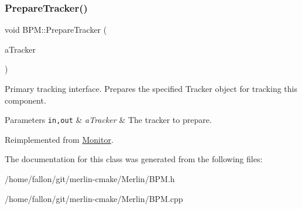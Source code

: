 \subsubsection{\texorpdfstring{Prepare\+Tracker()}{PrepareTracker()}}
{\footnotesize\ttfamily void B\+P\+M\+::\+Prepare\+Tracker (\begin{DoxyParamCaption}\item[{\hyperlink{classComponentTracker}{Component\+Tracker} \&}]{a\+Tracker }\end{DoxyParamCaption})\hspace{0.3cm}{\ttfamily [virtual]}}

Primary tracking interface. Prepares the specified Tracker object for tracking this component. 
\begin{DoxyParams}[1]{Parameters}
\mbox{\tt in,out}  & {\em a\+Tracker} & The tracker to prepare. \\
\hline
\end{DoxyParams}


Reimplemented from \hyperlink{classMonitor_a8d5e3ab0d68f89a51aabdcde2b01977a}{Monitor}.



The documentation for this class was generated from the following files\+:\begin{DoxyCompactItemize}
\item 
/home/fallon/git/merlin-\/cmake/\+Merlin/B\+P\+M.\+h\item 
/home/fallon/git/merlin-\/cmake/\+Merlin/B\+P\+M.\+cpp\end{DoxyCompactItemize}
